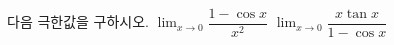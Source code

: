 다음 극한값을 구하시오.
 $\displaystyle\lim_{x\to 0}\dfrac{1-\cos x}{x^2}$
 $\displaystyle\lim_{x\to 0}\dfrac{x\tan x}{1-\cos x}$
